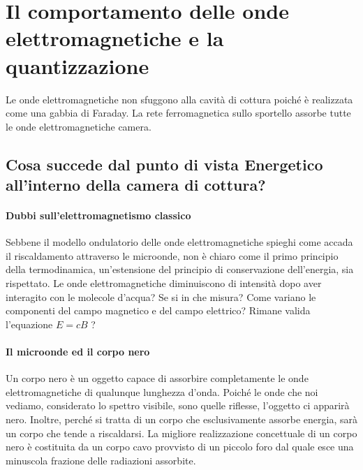 \documentclass{article}
\begin{document}
\section{Il comportamento delle onde elettromagnetiche e la quantizzazione}
Le onde elettromagnetiche non sfuggono alla cavità di cottura poiché è realizzata come una gabbia di Faraday. La rete ferromagnetica sullo sportello assorbe tutte le onde elettromagnetiche camera.
\subsection{Cosa succede dal punto di vista Energetico all'interno della camera di cottura? 
}
\paragraph{Dubbi sull'elettromagnetismo classico}
Sebbene il modello ondulatorio delle onde elettromagnetiche spieghi come accada il riscaldamento attraverso le microonde, non è chiaro come il primo principio della termodinamica, un'estensione del principio di conservazione dell'energia, sia rispettato. 
Le onde elettromagnetiche diminuiscono di intensità dopo aver interagito con le molecole d'acqua? Se si in che misura? Come variano le componenti del campo magnetico e del campo elettrico? Rimane valida l'equazione $E = cB$ ? 
\vspace*{-0.12in}
\paragraph{Il microonde ed il corpo nero}
Un corpo nero è un oggetto capace di assorbire completamente le onde elettromagnetiche di qualunque lunghezza d'onda.
Poiché le onde che noi vediamo, considerato lo spettro visibile, sono quelle riflesse, l'oggetto ci apparirà nero.  Inoltre, perché si tratta di un corpo che esclusivamente assorbe energia, sarà un corpo che tende a riscaldarsi. 
La migliore realizzazione concettuale di un corpo nero è costituita da un corpo cavo provvisto di un piccolo foro dal quale esce una minuscola frazione delle radiazioni assorbite. \\
\end{document}
